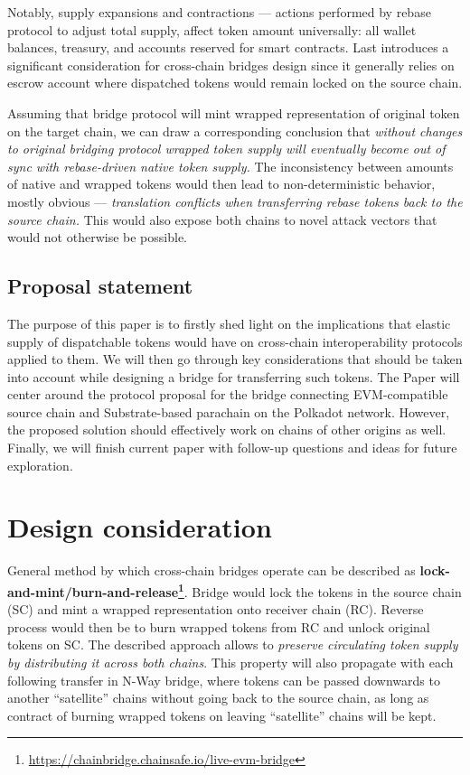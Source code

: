 \documentclass{article}
\begin{document}
Notably, supply expansions and contractions --- actions performed by rebase protocol to adjust total supply, affect token amount universally: all wallet balances, treasury, and accounts reserved for smart contracts. Last introduces a significant consideration for cross-chain bridges design since it generally relies on escrow account where dispatched tokens would remain locked on the source chain.

Assuming that bridge protocol will mint wrapped representation of original token on the target chain, we can draw a corresponding conclusion that \textit{without changes to original bridging protocol wrapped token supply will eventually become out of sync with rebase-driven native token supply.} The inconsistency between amounts of native and wrapped tokens would then lead to non-deterministic behavior, mostly obvious --- \textit{translation conflicts when transferring rebase tokens back to the source chain.} This would also expose both chains to novel attack vectors that would not otherwise be possible.

\subsection{Proposal statement}

The purpose of this paper is to firstly shed light on the implications that elastic supply of dispatchable tokens would have on cross-chain interoperability protocols applied to them. We will then go through key considerations that should be taken into account while designing a bridge for transferring such tokens. The Paper will center around the protocol proposal for the bridge connecting EVM-compatible source chain and Substrate-based parachain on the Polkadot network. However, the proposed solution should effectively work on chains of other origins as well. Finally, we will finish current paper with follow-up questions and ideas for future exploration.

\section{Design consideration}

General method by which cross-chain bridges operate can be described as \textbf{lock-and-mint/burn-and-release\footnote{\url{https://chainbridge.chainsafe.io/live-evm-bridge}}}. Bridge would lock the tokens in the source chain (SC) and mint a wrapped representation onto receiver chain (RC). Reverse process would then be to burn wrapped tokens from RC and unlock original tokens on SC. The described approach allows to \textit{preserve circulating token supply by distributing it across both chains}. This property will also propagate with each following transfer in N-Way bridge, where tokens can be passed downwards to another ``satellite'' chains without going back to the source chain, as long as contract of burning wrapped tokens on leaving ``satellite'' chains will be kept.
\end{document}

